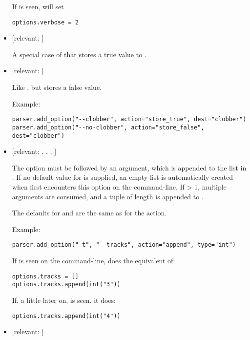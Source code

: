 \begin{itemize}
If  is seen,  will set
\begin{verbatim}
options.verbose = 2
\end{verbatim}

\item {} 
 {[}relevant: ]

A special case of  that stores a true value
to .

\item {} 
 {[}relevant: ]

Like , but stores a false value.

Example:
\begin{verbatim}
parser.add_option("--clobber", action="store_true", dest="clobber")
parser.add_option("--no-clobber", action="store_false", dest="clobber")
\end{verbatim}

\item {} 
 {[}relevant: , , , ]

The option must be followed by an argument, which is appended to the
list in .  If no default value for  is supplied, an
empty list is automatically created when  first encounters this
option on the command-line.  If  {\textgreater} 1, multiple arguments are
consumed, and a tuple of length  is appended to .

The defaults for  and  are the same as for the
 action.

Example:
\begin{verbatim}
parser.add_option("-t", "--tracks", action="append", type="int")
\end{verbatim}

If  is seen on the command-line,  does the equivalent of:
\begin{verbatim}
options.tracks = []
options.tracks.append(int("3"))
\end{verbatim}

If, a little later on,  is seen, it does:
\begin{verbatim}
options.tracks.append(int("4"))
\end{verbatim}

\item {} 
 {[}relevant: ]


\end{itemize}
